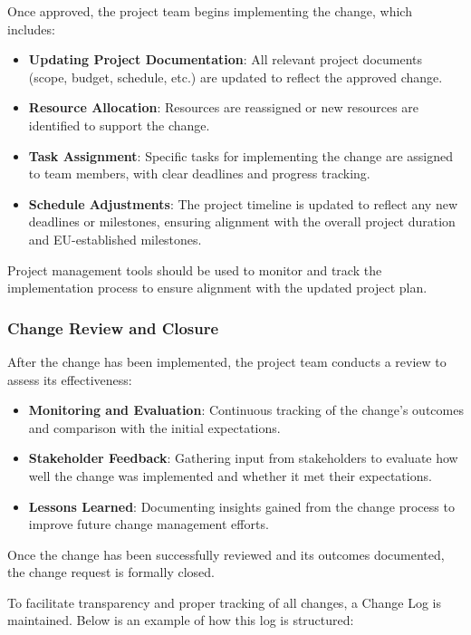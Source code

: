 \documentclass[a4paper,12pt]{article}
\begin{document}
Once approved, the project team begins implementing the change, which includes:

\begin{itemize}[left=1em, itemsep=0pt, topsep=0pt] 
    \item \textbf{Updating Project Documentation}: All relevant project documents (scope, budget, schedule, etc.) are updated to reflect the approved change. 
    \item \textbf{Resource Allocation}: Resources are reassigned or new resources are identified to support the change. 
    \item \textbf{Task Assignment}: Specific tasks for implementing the change are assigned to team members, with clear deadlines and progress tracking. 
    \item \textbf{Schedule Adjustments}: The project timeline is updated to reflect any new deadlines or milestones, ensuring alignment with the overall project duration and EU-established milestones.
\end{itemize}

Project management tools should be used to monitor and track the implementation process to ensure alignment with the updated project plan.

\subsubsection*{Change Review and Closure}

After the change has been implemented, the project team conducts a review to assess its effectiveness:

\begin{itemize}[left=1em, itemsep=0pt, topsep=0pt] 
    \item \textbf{Monitoring and Evaluation}: Continuous tracking of the change's outcomes and comparison with the initial expectations. 
    \item \textbf{Stakeholder Feedback}: Gathering input from stakeholders to evaluate how well the change was implemented and whether it met their expectations. 
    \item \textbf{Lessons Learned}: Documenting insights gained from the change process to improve future change management efforts. 
\end{itemize}

Once the change has been successfully reviewed and its outcomes documented, the change request is formally closed.

To facilitate transparency and proper tracking of all changes, a Change Log is maintained. Below is an example of how this log is structured:
\end{document}
